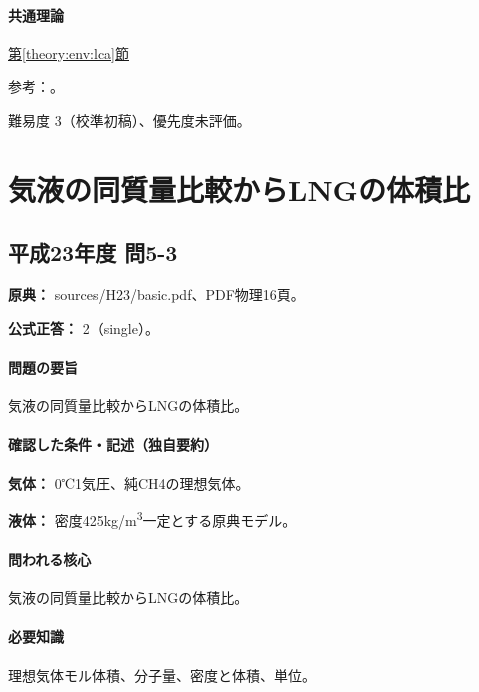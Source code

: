 \paragraph{共通理論} \hyperref[theory:env:lca]{第\ref*{theory:env:lca}節}

\par 参考：\cite{env58_pmstandard}。

\par 難易度 3（校準初稿）、優先度未評価。

\section{気液の同質量比較からLNGの体積比}

\subsection{平成23年度 問5-3}
\label{q:h23-reg-basic-5-3}

\noindent\textbf{原典：} sources/H23/basic.pdf、PDF物理16頁。

\textbf{公式正答：} 2（single）。

\paragraph{問題の要旨} 気液の同質量比較からLNGの体積比。

\paragraph{確認した条件・記述（独自要約）}\mbox{}\par

\noindent\textbf{気体：} 0℃1気圧、純CH4の理想気体。\par

\noindent\textbf{液体：} 密度425kg/m\textsuperscript{3}一定とする原典モデル。\par

\paragraph{問われる核心} 気液の同質量比較からLNGの体積比。

\paragraph{必要知識} 理想気体モル体積、分子量、密度と体積、単位。

